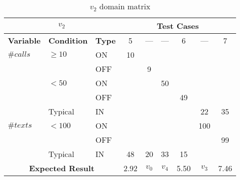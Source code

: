 %
  {\protect\numberline{}}
\begin{table}[!htbp]
  \centering
  \begin{tabular}{|*{3}{l|}*{6}{c|}}
    \hline
    \multicolumn{3}{|c|}{$v_2$}
    & \multicolumn{6}{|c|}{\textbf{Test Cases}} \\ \hline
    \textbf{Variable} & \textbf{Condition} & \textbf{Type}
                               &  5   &  ---  &  ---  &  6   &  ---  &  7   \\ \hline
    $\#calls$ & $\ge 10$ & ON  &  10  &       &       &      &       &      \\ \cline{3-9}
              &          & OFF &      &   9   &       &      &       &      \\ \cline{2-9}
              & $< 50$   & ON  &      &       &  50   &      &       &      \\ \cline{3-9}
              &          & OFF &      &       &       &  49  &       &      \\ \cline{2-9}
              & Typical  & IN  &      &       &       &      &  22   &  35  \\ \hline
    $\#texts$ & $< 100$  & ON  &      &       &       &      &  100  &      \\ \cline{3-9}
              &          & OFF &      &       &       &      &       &  99  \\ \cline{2-9}
              & Typical  & IN  &  48  &  20   &  33   &  15  &       &      \\ \hline
    \multicolumn{3}{|c|}{\textbf{Expected Result}}
                               & 2.92 & $v_0$ & $v_4$ & 5.50 & $v_3$ & 7.46 \\ \hline
  \end{tabular}
  \caption{$v_2$ domain matrix}
  \label{tab:methods.computeBill.matrices.v2}
\end{table}

